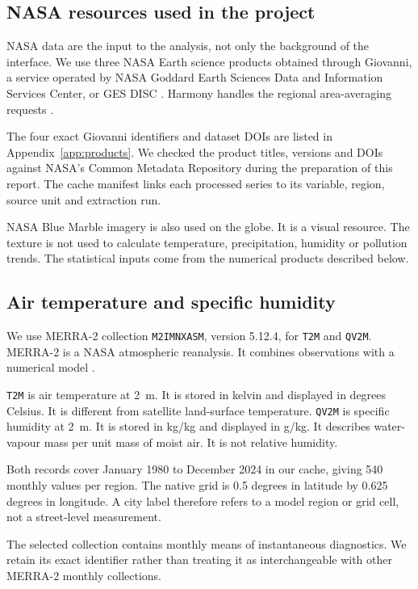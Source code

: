 \documentclass[10pt,a4paper,twocolumn]{article}
\newcommand{\code}[1]{\texttt{#1}}
\begin{document}
\subsection{NASA resources used in the project}
NASA data are the input to the analysis, not only the background of the interface. We use three NASA Earth science products obtained through Giovanni, a service operated by NASA Goddard Earth Sciences Data and Information Services Center, or GES DISC \cite{giovanni}. Harmony handles the regional area-averaging requests \cite{harmony}.

The four exact Giovanni identifiers and dataset DOIs are listed in Appendix~\ref{app:products}. We checked the product titles, versions and DOIs against NASA's Common Metadata Repository during the preparation of this report. The cache manifest links each processed series to its variable, region, source unit and extraction run.

NASA Blue Marble imagery is also used on the globe. It is a visual resource. The texture is not used to calculate temperature, precipitation, humidity or pollution trends. The statistical inputs come from the numerical products described below.

\subsection{Air temperature and specific humidity}
We use MERRA-2 collection \code{M2IMNXASM}, version 5.12.4, for \code{T2M} and \code{QV2M}. MERRA-2 is a NASA atmospheric reanalysis. It combines observations with a numerical model \cite{merra,gelaro}.

\code{T2M} is air temperature at 2~m. It is stored in kelvin and displayed in degrees Celsius. It is different from satellite land-surface temperature. \code{QV2M} is specific humidity at 2~m. It is stored in kg/kg and displayed in g/kg. It describes water-vapour mass per unit mass of moist air. It is not relative humidity.

Both records cover January 1980 to December 2024 in our cache, giving 540 monthly values per region. The native grid is 0.5 degrees in latitude by 0.625 degrees in longitude. A city label therefore refers to a model region or grid cell, not a street-level measurement.

The selected collection contains monthly means of instantaneous diagnostics. We retain its exact identifier rather than treating it as interchangeable with other MERRA-2 monthly collections.
\end{document}
